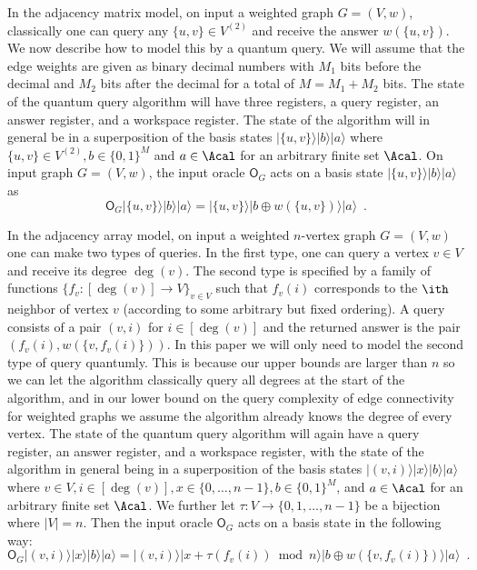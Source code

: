 In the adjacency matrix model, on input a weighted graph $G = (V,w)$, classically one can query any $\{u,v\} \in V^{(2)}$ and receive the answer 
$w(\{u,v\})$.  We now describe how to model this by a quantum query.  We will assume that the 
edge weights are given as binary decimal numbers with $M_1$ bits before the decimal and $M_2$ bits after the decimal for a total of $M = M_1 + M_2$ bits.  
The state of the quantum query 
algorithm will have three registers, a query register, an answer register, and a workspace register.  The 
state of the algorithm will in general be in a superposition of the basis states $|\{u,v\} \rangle |b \rangle | a \rangle$ where $\{u,v\} \in V^{(2)}, b \in \{0,1\}^M$ 
and $a \in \Acal$ for an arbitrary finite set $\Acal$.  
On input graph $G = (V,w)$, the input oracle $\mathsf{O}_G$ acts on a basis state $|\{u,v\} \rangle |b \rangle | a \rangle$ as
\[
\mathsf{O}_G |\{u,v\} \rangle |b \rangle | a \rangle = |\{u,v\} \rangle |b \oplus w(\{u,v\}) \rangle | a \rangle \enspace.
\]
 
In the adjacency array model, on input a weighted $n$-vertex graph $G = (V,w)$ one can make two types of queries.  In the first type, one can query a vertex $v \in V$ and receive its degree $\deg(v)$.
The second type is specified by a family of functions $\{f_v : [\deg(v)] \rightarrow V\}_{v \in V}$ such that $f_v(i)$ corresponds to the $\ith$ neighbor of vertex $v$ (according to some arbitrary but fixed ordering).  
A query consists of a pair $(v,i)$ for $i \in [\deg(v)]$ and the returned answer is the pair
$(f_v(i), w(\{v,f_v(i)\}))$.  In this paper we will only 
need to model the second type of query quantumly.  This is because our upper bounds are larger than $n$ so we can let the algorithm classically 
query all degrees at the start of the algorithm, and in our lower bound on the query complexity of edge connectivity for weighted graphs we assume the 
algorithm already knows the degree of every vertex.  
The state of the quantum query algorithm will again have a query register, an answer register, and a workspace register, with the state of the algorithm 
in general being in a superposition of the basis states $|(v,i)\rangle |x \rangle |b \rangle | a \rangle$ where $v \in V, i \in [\deg(v)], x \in \{0,\ldots, n-1\}, b \in \{0,1\}^M$, 
and $a \in \Acal$ for an arbitrary finite set $\Acal$.  We further let $\tau : V \rightarrow \{0,1,\ldots, n-1\}$ be a bijection where $|V| = n$.  Then the input oracle $\mathsf{O}_G$ acts on a basis state in the following way:
\[
\mathsf{O}_G |(v,i)\rangle |x \rangle |b \rangle | a \rangle = |(v,i) \rangle |x + \tau(f_v(i)) \bmod n \rangle |b \oplus w(\{v,f_v(i)\}) \rangle | a \rangle \enspace.
\]

